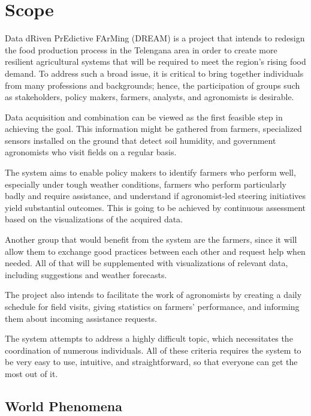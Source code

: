 \section{Scope}

Data dRiven PrEdictive FArMing (DREAM) is a project that intends to redesign the food production process in the Telengana area in order to create more resilient agricultural systems that will be required to meet the region's rising food demand. To address such a broad issue, it is critical to bring together individuals from many professions and backgrounds; hence, the participation of groups such as stakeholders, policy makers, farmers, analysts, and agronomists is desirable.

Data acquisition and combination can be viewed as the first feasible step in achieving the goal. This information might be gathered from farmers, specialized sensors installed on the ground that detect soil humidity, and government agronomists who visit fields on a regular basis.

The system aims to enable policy makers to identify farmers who perform well, especially under tough weather conditions, farmers who perform particularly badly and require assistance, and understand if agronomist-led steering initiatives yield substantial outcomes. This is going to be achieved by continuous assessment based on the visualizations of the acquired data.

Another group that would benefit from the system are the farmers, since it will allow them to exchange good practices between each other and request help when needed. All of that will be supplemented with visualizations of relevant data, including suggestions and weather forecasts.

The project also intends to facilitate the work of agronomists by creating a daily schedule for field visits, giving statistics on farmers' performance, and informing them about incoming assistance requests.

The system attempts to address a highly difficult topic, which necessitates the coordination of numerous individuals. All of these criteria requires the system to be very easy to use, intuitive, and straightforward, so that everyone can get the most out of it.

\subsection{World Phenomena}

